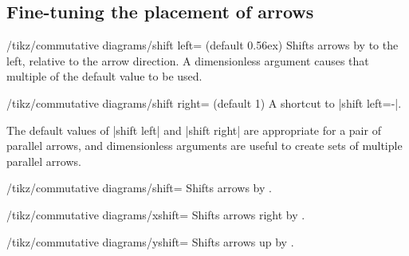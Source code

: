 \documentclass[a4paper]{ltxdoc}
\begin{document}
\subsection{Fine-tuning the placement of arrows}
\label{sec:fine-tuning-arrows}

\begin{key}{/tikz/commutative diagrams/shift left=
    (default 0.56ex)}
  Shifts arrows by  to the left, relative to the arrow
  direction.  A dimensionless argument causes that multiple of the
  default value to be used.
\end{key}

\begin{key}{/tikz/commutative diagrams/shift right=
    (default 1)}
  A shortcut to |shift left=-|.
\end{key}

\begin{codeexample}[]
\end{codeexample}

The default values of |shift left| and |shift right| are appropriate
for a pair of parallel arrows, and dimensionless arguments are useful
to create sets of multiple parallel arrows.
\begin{codeexample}[]
\end{codeexample}

\begin{key}{/tikz/commutative diagrams/shift=}
  Shifts arrows by .
\end{key}

\begin{key}{/tikz/commutative diagrams/xshift=}
  Shifts arrows right by .
\end{key}

\begin{key}{/tikz/commutative diagrams/yshift=}
  Shifts arrows up by .
\end{key}
\end{document}
